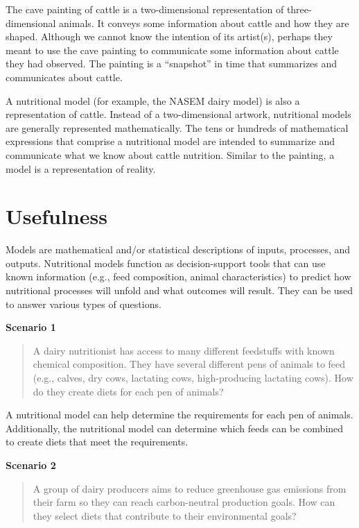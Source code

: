 \documentclass[
]{book}
\begin{document}
The cave painting of cattle is a two-dimensional representation of three-dimensional animals. It conveys some information about cattle and how they are shaped. Although we cannot know the intention of its artist(s), perhaps they meant to use the cave painting to communicate some information about cattle they had observed. The painting is a ``snapshot'' in time that summarizes and communicates about cattle.

A nutritional model (for example, the NASEM dairy model) is also a representation of cattle. Instead of a two-dimensional artwork, nutritional models are generally represented mathematically. The tens or hundreds of mathematical expressions that comprise a nutritional model are intended to summarize and communicate what we know about cattle nutrition. Similar to the painting, a model is a representation of reality.

\hypertarget{usefulness}{%
\section{Usefulness}\label{usefulness}}

Models are mathematical and/or statistical descriptions of inputs, processes, and outputs. Nutritional models function as decision-support tools that can use known information (e.g., feed composition, animal characteristics) to predict how nutritional processes will unfold and what outcomes will result. They can be used to answer various types of questions.

\textbf{Scenario 1}

\begin{quote}
A dairy nutritionist has access to many different feedstuffs with known chemical composition. They have several different pens of animals to feed (e.g., calves, dry cows, lactating cows, high-producing lactating cows). How do they create diets for each pen of animals?
\end{quote}

A nutritional model can help determine the requirements for each pen of animals. Additionally, the nutritional model can determine which feeds can be combined to create diets that meet the requirements.

\textbf{Scenario 2}

\begin{quote}
A group of dairy producers aims to reduce greenhouse gas emissions from their farm so they can reach carbon-neutral production goals. How can they select diets that contribute to their environmental goals?
\end{quote}
\end{document}
